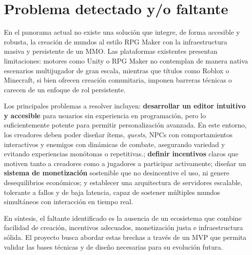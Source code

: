 \section{Problema detectado y/o faltante}

En el panorama actual no existe una solución que integre, de forma accesible y robusta, la creación de mundos al estilo RPG Maker con la infraestructura masiva y persistente de un MMO. 
Las plataformas existentes presentan limitaciones: motores como Unity o RPG Maker no contemplan de manera nativa escenarios multijugador de gran escala, 
mientras que títulos como Roblox o Minecraft, si bien ofrecen creación comunitaria, imponen barreras técnicas o carecen de un enfoque de rol persistente.  
\vspace{0.25cm}

Los principales problemas a resolver incluyen: \textbf{desarrollar un editor intuitivo y accesible} para usuarios sin experiencia en programación, 
pero lo suficientemente potente para permitir personalización avanzada. En este entorno, los creadores deben poder diseñar ítems, \textit{quests},
NPCs con comportamientos interactivos y enemigos con dinámicas de combate, asegurando variedad y evitando experiencias 
monótonas o repetitivas.; \textbf{definir incentivos} claros que motiven tanto a creadores como a jugadores a participar activamente; 
diseñar un \textbf{sistema de monetización} sostenible que no desincentive el uso, ni genere desequilibrios económicos; 
y establecer una arquitectura de servidores escalable, tolerante a fallos y de baja latencia, capaz de sostener múltiples mundos simultáneos con interacción en tiempo real.  
\vspace{0.25cm}

En síntesis, el faltante identificado es la ausencia de un ecosistema que combine facilidad de creación, incentivos adecuados, monetización justa e infraestructura sólida. 
El proyecto busca abordar estas brechas a través de un MVP que permita validar las bases técnicas y de diseño necesarias para su evolución futura.
